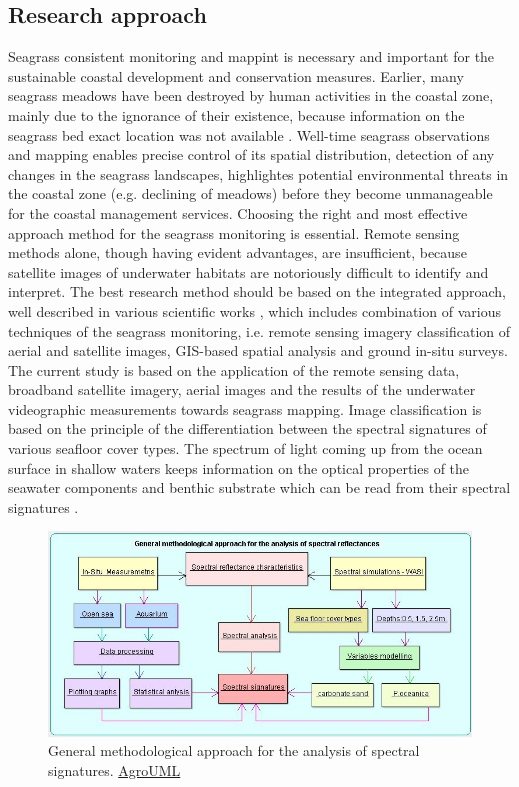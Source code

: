 \documentclass[10pt, a4paper]{article}
\begin{document}
\subsection{Research approach}
Seagrass consistent monitoring and mappint is necessary and important for the sustainable coastal
development and conservation measures. Earlier, many seagrass meadows have been destroyed by
human activities in the coastal zone, mainly due to the ignorance of their existence, because
information on the seagrass bed exact location was not available \cite{Choo06}\label{Choo06}. Well-time seagrass
observations and mapping enables precise control of its spatial distribution, detection of any changes
in the seagrass landscapes, highlightes potential environmental threats in the coastal zone (e.g.
declining of meadows) before they become unmanageable for the coastal management services.
Choosing the right and most effective approach method for the seagrass monitoring is essential.
Remote sensing methods alone, though having evident advantages, are insufficient, because satellite
images of underwater habitats are notoriously difficult to identify and interpret. The best research
method should be based on the integrated approach, well described in various scientific works \cite{Brown02,Montefalcone06,Kirkman96}\label{Brown02} \label{Montefalcone06} \label{Kirkman96}, which includes combination of various
techniques of the seagrass monitoring, i.e. remote sensing imagery classification of aerial and satellite
images, GIS-based spatial analysis and ground in-situ surveys.
The current study is based on the application of the remote sensing data, broadband satellite imagery,
aerial images and the results of the underwater videographic measurements towards seagrass
mapping. Image classification is based on the principle of the differentiation between the spectral
signatures of various seafloor cover types. The spectrum of light coming up from the ocean surface in
shallow waters keeps information on the optical properties of the seawater components and benthic
substrate which can be read from their spectral signatures \cite{Werdell03}\label{Werdell03}. \\

\begin{figure}[h]
	\centering
	\includegraphics[scale=0.48]{UML_ClassDiagram.jpg}
	\caption{General methodological approach for the analysis of spectral signatures. \href{http://argouml.tigris.org/}{AgroUML}}
	\label{fig:16}
\end{figure}
\end{document}
